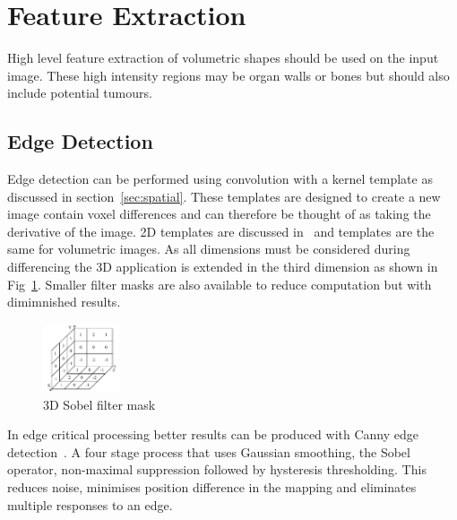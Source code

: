 \documentclass[journal]{IEEEtran}
\begin{document}
\section{Feature Extraction}
\label{sec:extraction}

High level feature extraction of volumetric shapes should be used on the input image.
These high intensity regions may be organ walls or bones but should also include potential tumours.


\subsection{Edge Detection}
\label{sec:edge}
Edge detection can be performed using convolution with a kernel template as discussed in section~\ref{sec:spatial}. 
These templates are designed to create a new image contain voxel differences and can therefore be thought of as taking the derivative of the image.
2D templates are discussed in~\cite{nixon02feature} and templates are the same for volumetric images.
As all dimensions must be considered during differencing the 3D application is extended in the third dimension as shown in Fig~\ref{fig:sobel}.
Smaller filter masks are also available to reduce computation but with dimimnished results.

\begin{figure}[!htb]
   \centering
   \includegraphics[width = 0.2\textwidth]{Figures/Sobel.pdf}
   \caption{3D Sobel filter mask~\cite{lohmann1998volumetric}}
   \label{fig:sobel}
\end{figure}

In edge critical processing better results can be produced with Canny edge detection~\cite{canny86edge}. 
A four stage process that uses Gaussian smoothing, the Sobel operator, non-maximal suppression followed by hysteresis thresholding.
This reduces noise, minimises position difference in the mapping and eliminates multiple responses to an edge.
\end{document}
